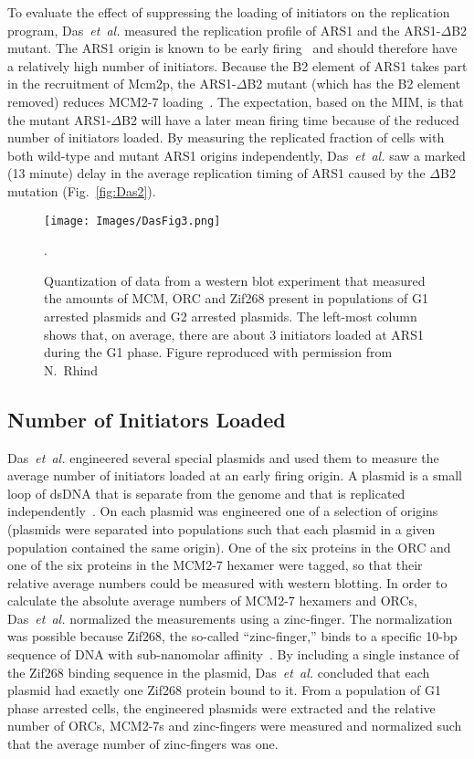 {		To evaluate the effect of suppressing the loading of initiators on the replication program, Das~\emph{et~al.} measured the replication profile of ARS1 and the ARS1-$\Delta$B2 mutant.
		The ARS1 origin is known to be early firing~\cite{OriDB} and should therefore have a relatively high number of initiators.
		Because the B2 element of ARS1 takes part in the recruitment of Mcm2p, the ARS1-$\Delta$B2 mutant (which has the B2 element removed) reduces MCM2-7 loading~\cite{ARS1Mutant}.
		The expectation, based on the MIM, is that the mutant ARS1-$\Delta$B2 will have a later mean firing time because of the reduced number of initiators loaded.
		By measuring the replicated fraction of cells with both wild-type and mutant ARS1 origins independently, Das~\emph{et~al.} saw a marked (13 minute) delay in the average replication timing of ARS1 caused by the $\Delta$B2 mutation (Fig.~\ref{fig:Das2}).
		
		\begin{figure}[tbh]
			\begin{center}
				\texttt{[image: Images/DasFig3.png]}
			\end{center}
				\caption[Absolute Number of Loaded MCMs at ARS1]{\label{fig:Das3} Quantization of data from a western blot experiment that measured the amounts of MCM, ORC and Zif268 present in populations of G1 arrested plasmids and G2 arrested plasmids.
					The left-most column shows that, on average, there are about 3 initiators loaded at ARS1 during the G1 phase.
					Figure reproduced with permission from N.~Rhind~\cite{Rhind}}.
		\end{figure}
		
		
		\subsection{Number of Initiators Loaded}
		\label{subsec:NoInitiatorsLoaded}
		
		Das~\emph{et~al.} engineered several special plasmids and used them to measure the average number of initiators loaded at an early firing origin.
		A plasmid is a small loop of dsDNA that is separate from the genome and that is replicated independently~\cite{MolecularCellBiology}.
		On each plasmid was engineered one of a selection of origins (plasmids were separated into populations such that each plasmid in a given population contained the same origin).
		One of the six proteins in the ORC and one of the six proteins in the MCM2-7 hexamer were tagged, so that their relative average numbers could be measured with western blotting.
		In order to calculate the absolute average numbers of MCM2-7 hexamers and ORCs, Das~\emph{et~al.} normalized the measurements using a zinc-finger.
		The normalization was possible because Zif268, the so-called ``zinc-finger,'' binds to a specific 10-bp sequence of DNA with sub-nanomolar affinity~\cite{ZincFingers}.
		By including a single instance of the Zif268 binding sequence in the plasmid, Das~\emph{et~al.} concluded that each plasmid had exactly one Zif268 protein bound to it.
		From a population of G1 phase arrested cells, the engineered plasmids were extracted and the relative number of ORCs, MCM2-7s and zinc-fingers were measured and normalized such that the average number of zinc-fingers was one.
		
}
